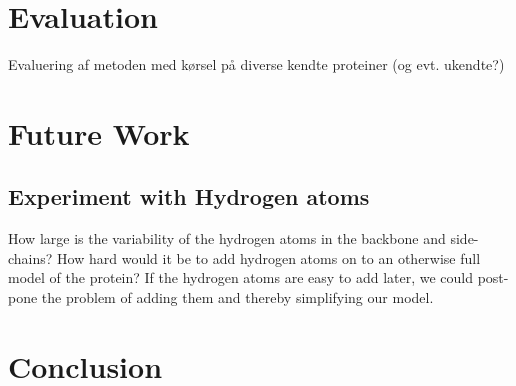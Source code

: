 \documentclass[10pt,a4paper,final,oneside,openany,article,twocolumn]{memoir}
\begin{document}
\chapter{Evaluation}
Evaluering af metoden med kørsel på diverse kendte proteiner (og
evt. ukendte?)

\chapter{Future Work}

\section{Experiment with Hydrogen atoms}
How large is the variability of the hydrogen atoms in the backbone and
side-chains? How hard would it be to add hydrogen atoms on to an
otherwise full model of the protein? If the hydrogen atoms are easy to
add later, we could post-pone the problem of adding them and thereby
simplifying our model.

\chapter{Conclusion}

\printbibliography
\end{document}
